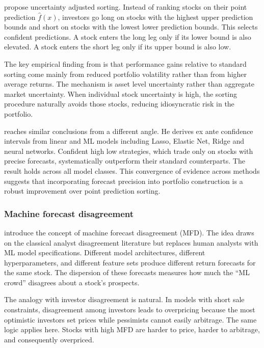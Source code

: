 \cite{liu2026uncertainty} propose uncertainty adjusted sorting. Instead of ranking stocks on their point prediction $\hat{f}(x)$, investors go long on stocks with the highest upper prediction bounds and short on stocks with the lowest lower prediction bounds. This selects confident predictions. A stock enters the long leg only if its lower bound is also elevated. A stock enters the short leg only if its upper bound is also low.

The key empirical finding from \cite{liu2026uncertainty} is that performance gains relative to standard sorting come mainly from reduced portfolio volatility rather than from higher average returns. The mechanism is asset level uncertainty rather than aggregate market uncertainty. When individual stock uncertainty is high, the sorting procedure naturally avoids those stocks, reducing idiosyncratic risk in the portfolio.

\cite{allena2025confident} reaches similar conclusions from a different angle. He derives ex ante confidence intervals from linear and ML models including Lasso, Elastic Net, Ridge and neural networks. Confident high low strategies, which trade only on stocks with precise forecasts, systematically outperform their standard counterparts. The result holds across all model classes. This convergence of evidence across methods suggests that incorporating forecast precision into portfolio construction is a robust improvement over point prediction sorting.

\subsubsection{Machine forecast disagreement}\label{sec_mfd}

\cite{bali2025disagreement} introduce the concept of machine forecast disagreement (MFD). The idea draws on the classical analyst disagreement literature but replaces human analysts with ML model specifications. Different model architectures, different hyperparameters, and different feature sets produce different return forecasts for the same stock. The dispersion of these forecasts measures how much the ``ML crowd'' disagrees about a stock's prospects.

The analogy with investor disagreement is natural. In models with short sale constraints, disagreement among investors leads to overpricing because the most optimistic investors set prices while pessimists cannot easily arbitrage. The same logic applies here. Stocks with high MFD are harder to price, harder to arbitrage, and consequently overpriced.

